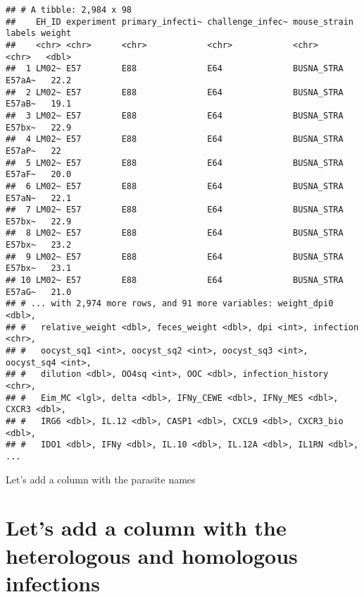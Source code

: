 \documentclass[
]{article}
\begin{document}
\begin{verbatim}
## # A tibble: 2,984 x 98
##    EH_ID experiment primary_infecti~ challenge_infec~ mouse_strain labels weight
##    <chr> <chr>      <chr>            <chr>            <chr>        <chr>   <dbl>
##  1 LM02~ E57        E88              E64              BUSNA_STRA   E57aA~   22.2
##  2 LM02~ E57        E88              E64              BUSNA_STRA   E57aB~   19.1
##  3 LM02~ E57        E88              E64              BUSNA_STRA   E57bx~   22.9
##  4 LM02~ E57        E88              E64              BUSNA_STRA   E57aP~   22  
##  5 LM02~ E57        E88              E64              BUSNA_STRA   E57aF~   20.0
##  6 LM02~ E57        E88              E64              BUSNA_STRA   E57aN~   22.1
##  7 LM02~ E57        E88              E64              BUSNA_STRA   E57bx~   22.9
##  8 LM02~ E57        E88              E64              BUSNA_STRA   E57bx~   23.2
##  9 LM02~ E57        E88              E64              BUSNA_STRA   E57bx~   23.1
## 10 LM02~ E57        E88              E64              BUSNA_STRA   E57aG~   21.0
## # ... with 2,974 more rows, and 91 more variables: weight_dpi0 <dbl>,
## #   relative_weight <dbl>, feces_weight <dbl>, dpi <int>, infection <chr>,
## #   oocyst_sq1 <int>, oocyst_sq2 <int>, oocyst_sq3 <int>, oocyst_sq4 <int>,
## #   dilution <dbl>, OO4sq <int>, OOC <dbl>, infection_history <chr>,
## #   Eim_MC <lgl>, delta <dbl>, IFNy_CEWE <dbl>, IFNy_MES <dbl>, CXCR3 <dbl>,
## #   IRG6 <dbl>, IL.12 <dbl>, CASP1 <dbl>, CXCL9 <dbl>, CXCR3_bio <dbl>,
## #   IDO1 <dbl>, IFNy <dbl>, IL.10 <dbl>, IL.12A <dbl>, IL1RN <dbl>, ...
\end{verbatim}

Let's add a column with the parasite names

\hypertarget{lets-add-a-column-with-the-heterologous-and-homologous-infections}{%
\section{Let's add a column with the heterologous and homologous
infections}\label{lets-add-a-column-with-the-heterologous-and-homologous-infections}}
\end{document}
